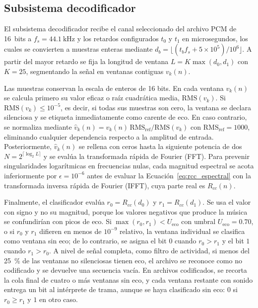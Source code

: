 \subsection{Subsistema decodificador}
\label{sec:decodificador}

El subsistema decodificador recibe el canal seleccionado del archivo PCM de \SI{16}{bits} a $f_s = \SI{44.1}{\kilo\hertz}$ y los retardos configurados $t_0$ y $t_1$ en microsegundos, los cuales se convierten a muestras enteras mediante $d_b = \lfloor (t_b f_s + 5\times 10^5)/10^6 \rfloor$. A partir del mayor retardo se fija la longitud de ventana $L = K \max(d_0, d_1)$ con $K = 25$, segmentando la señal en ventanas contiguas $v_k(n)$.


Las muestras conservan la escala de enteros de 16 bits. En cada ventana $v_k(n)$ se calcula primero su valor eficaz o raíz cuadrática media, $\mathrm{RMS}(v_k)$. Si $\mathrm{RMS}(v_k) \le 10^{-5}$, es decir, si todas sus muestras son cero, la ventana se declara silenciosa y se etiqueta inmediatamente  como carente de eco. En caso contrario, se normaliza mediante $\hat{v}_k(n) = v_k(n)\,\mathrm{RMS}_{\mathrm{ref}}/\mathrm{RMS}(v_k)$ con $\mathrm{RMS}_{\mathrm{ref}} = 1000$, eliminando cualquier dependencia respecto a la amplitud de entrada. Posteriormente, $\hat{v}_k(n)$ se rellena con ceros hasta la siguiente potencia de dos $N = 2^{\lceil \log_2 L \rceil}$ y se evalúa la transformada rápida de Fourier (FFT). Para prevenir singularidades logarítmicas en frecuencias nulas, cada magnitud espectral se acota inferiormente por $\epsilon = 10^{-6}$ antes de evaluar la Ecuación~\eqref{eq:rcc_espectral} con la transformada inversa rápida de Fourier (IFFT), cuya parte real es $R_{cc}(n)$.

Finalmente, el clasificador evalúa $r_0 = R_{cc}(d_0)$ y $r_1 = R_{cc}(d_1)$. Se usa el valor con signo y no su magnitud, porque los valores negativos que produce la música se confundirían con picos de eco. Si $\max(r_0, r_1) < U_{\mathrm{eco}}$ con umbral $U_{\mathrm{eco}} = 0.70$, o si $r_0$ y $r_1$ difieren en menos de $10^{-9}$ relativo, la ventana individual se clasifica como ventana sin eco; de lo contrario, se asigna el bit $0$ cuando $r_0 > r_1$ y el bit $1$ cuando $r_1 > r_0$. A nivel de señal completa, como filtro de actividad, si menos del \SI{25}{\percent} de las ventanas no silenciosas tienen eco, el archivo se reconoce como no codificado y se devuelve una secuencia vacía. En archivos codificados, se recorta la cola final de cuatro o más ventanas sin eco, y cada ventana restante con sonido entrega un bit al intérprete de trama, aunque se haya clasificado sin eco: $0$ si $r_0 \ge r_1$ y $1$ en otro caso.
